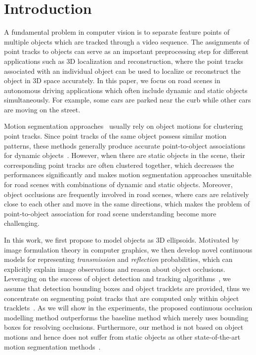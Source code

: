 \section{Introduction}

A fundamental problem in computer vision is to separate feature points of multiple objects which are tracked through a video sequence. The assignments of point tracks to objects can serve as an important preprocessing step for different applications such as 3D localization and reconstruction, where the point tracks associated with an individual object can be used to localize or reconstruct the object in 3D space accurately. In this paper, we focus on road scenes in autonomous driving applications which often include dynamic and static objects simultaneously. For example, some cars are parked near the curb while other cars are moving on the street. 

Motion segmentation approaches~\cite{Rao_etal_2010,Brox_Malik_2010} usually rely on object motions for clustering point tracks. Since point tracks of the same object possess similar motion patterns, these methods generally produce accurate point-to-object associations for dynamic objects~\cite{Tron_Vidal_2007}. However, when there are static objects in the scene, their corresponding point tracks are often clustered together, which decreases the performances significantly and makes motion segmentation approaches unsuitable for road scenes with combinations of dynamic and static objects. Moreover, object occlusions are frequently involved in road scenes, where cars are relatively close to each other and move in the same directions, which makes the problem of point-to-object association for road scene understanding become more challenging.

In this work, we first propose to model objects as 3D ellipsoids. Motivated by image formulation theory in computer graphics, we then develop novel continuous models for representing \emph{transmission} and \emph{reflection} probabilities, which can explicitly explain image observations and reason about object occlusions. Leveraging on the success of object detection and tracking algorithms~\cite{Felzenszwalb_etal_2010,Choi_Savarese_2010}, we assume that detection bounding boxes and object tracklets are provided, thus we concentrate on segmenting point tracks that are computed only within object tracklets~\cite{Zach2007}. As we will show in the experiments, the proposed continuous occlusion modelling method outperforms the baseline method which merely uses bounding boxes for resolving occlusions. Furthermore, our method is not based on object motions and hence does not suffer from static objects as other state-of-the-art motion segmentation methods~\cite{Rao_etal_2010,Brox_Malik_2010}.


